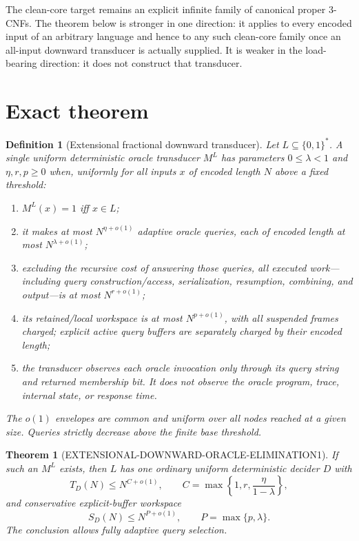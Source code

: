 \documentclass[11pt]{article}
\newtheorem{definition}{Definition}
\newtheorem{theorem}{Theorem}
\begin{document}
The clean-core target remains an explicit infinite family of canonical proper
3-CNFs.  The theorem below is stronger in one direction: it applies to every
encoded input of an arbitrary language and hence to any such clean-core family
once an all-input downward transducer is actually supplied.  It is weaker in
the load-bearing direction: it does not construct that transducer.

\section{Exact theorem}

\begin{definition}[Extensional fractional downward transducer]
Let $L\subseteq\{0,1\}^*$.  A single uniform deterministic oracle transducer
$M^L$ has parameters $0\le\lambda<1$ and $\eta,r,p\ge0$ when, uniformly for all
inputs $x$ of encoded length $N$ above a fixed threshold:
\begin{enumerate}
\item $M^L(x)=1$ iff $x\in L$;
\item it makes at most $N^{\eta+o(1)}$ adaptive oracle queries, each of encoded
length at most $N^{\lambda+o(1)}$;
\item excluding the recursive cost of answering those queries, all executed
work---including query construction/access, serialization, resumption,
combining, and output---is at most $N^{r+o(1)}$;
\item its retained/local workspace is at most $N^{p+o(1)}$, with all suspended
frames charged; explicit active query buffers are separately charged by their
encoded length;
\item the transducer observes each oracle invocation only through its query
string and returned membership bit.  It does not observe the oracle program,
trace, internal state, or response time.
\end{enumerate}
The $o(1)$ envelopes are common and uniform over all nodes reached at a given
size.  Queries strictly decrease above the finite base threshold.
\end{definition}

\begin{theorem}[EXTENSIONAL-DOWNWARD-ORACLE-ELIMINATION1]
If such an $M^L$ exists, then $L$ has one ordinary uniform deterministic
decider $D$ with
\[
 T_D(N)\le N^{C+o(1)},
 \qquad
 C=\max\left\{1,r,\frac{\eta}{1-\lambda}\right\},
\]
and conservative explicit-buffer workspace
\[
 S_D(N)\le N^{P+o(1)},
 \qquad P=\max\{p,\lambda\}.
\]
The conclusion allows fully adaptive query selection.
\end{theorem}
\end{document}
